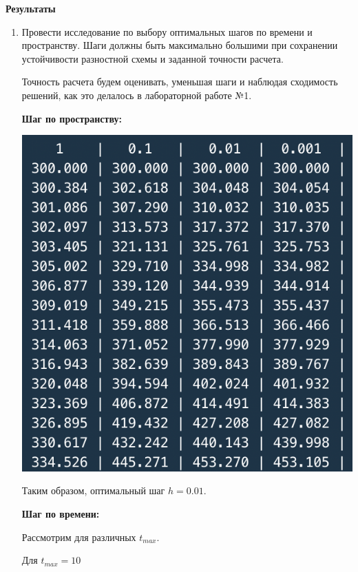 \documentclass[a4paper,14pt]{extreport} %
\begin{document}
\textbf{Результаты}


\begin{enumerate}
\item Провести исследование по выбору оптимальных шагов по времени и пространству. Шаги должны быть максимально большими при сохранении устойчивости разностной схемы и заданной точности расчета. 

Точность расчета будем оценивать, уменьшая шаги и наблюдая сходимость решений, как это делалось в лабораторной работе №1. 

\textbf{Шаг по пространству:}

\includegraphics{1}

Таким образом, оптимальный шаг $h=0.01$. 

\textbf{Шаг по времени:}

Рассмотрим для различных $t_{max}$. 

Для $t_{max} = 10$


\end{enumerate}
\end{document}
